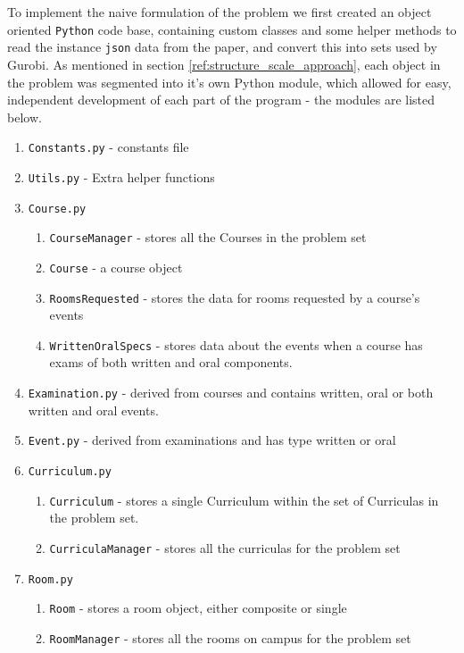 \documentclass{article}
\newcommand{\inlinecode}[1]{\colorbox{gray!20}{\texttt{#1}}}
\begin{document}
To implement the naive formulation of the problem we first created an object oriented \texttt{Python} code base, containing custom classes and some helper methods to read the instance \texttt{json} data from the paper, and convert this into sets used by Gurobi. As mentioned in section \ref{ref:structure_scale_approach}, each object in the problem was segmented into it's own Python module, which allowed for easy, independent development of each part of the program - the modules are listed below.
\begin{enumerate}
    \item \inlinecode{Constants.py} - constants file
    \item \inlinecode{Utils.py} - Extra helper functions
    \item \inlinecode{Course.py}
    \begin{enumerate}
        \item \inlinecode{CourseManager} - stores all the Courses in the problem set
        \item \inlinecode{Course} - a course object
        \item \inlinecode{RoomsRequested} - stores the data for rooms requested by a course's events
        \item \inlinecode{WrittenOralSpecs} - stores data about the events when a course has exams of both written and oral components.
    \end{enumerate}
    \item \inlinecode{Examination.py} - derived from courses and contains written, oral or both written and oral events.
    \item \inlinecode{Event.py} - derived from examinations and has type written or oral
    \item \inlinecode{Curriculum.py}
    \begin{enumerate}
        \item \inlinecode{Curriculum} - stores a single Curriculum within the set of Curriculas in the problem set.
        \item \inlinecode{CurriculaManager} - stores all the curriculas for the problem set
    \end{enumerate}
    \item \inlinecode{Room.py}
    \begin{enumerate}
        \item \inlinecode{Room} - stores a room object, either composite or single
        \item \inlinecode{RoomManager} - stores all the rooms on campus for the problem set

\end{enumerate}
\end{enumerate}
\end{document}
